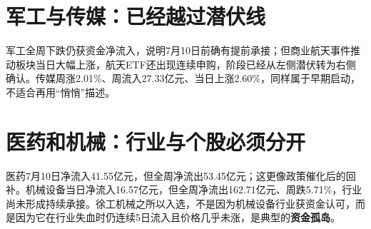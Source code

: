 \section{军工与传媒：已经越过潜伏线}

军工全周下跌仍获资金净流入，说明7月10日前确有提前承接；但商业航天事件推动板块当日大幅上涨，航天ETF还出现连续申购，阶段已经从左侧潜伏转为右侧确认。传媒周涨2.01\%、周流入27.33亿元、当日上涨2.60\%，同样属于早期启动，不适合再用“悄悄”描述。

\section{医药和机械：行业与个股必须分开}

医药7月10日净流入41.55亿元，但全周净流出53.45亿元；这更像政策催化后的回补。机械设备当日净流入16.57亿元，但全周净流出162.71亿元、周跌5.71\%，行业尚未形成持续承接。徐工机械之所以入选，不是因为机械设备行业获资金认可，而是因为它在行业失血时仍连续5日流入且价格几乎未涨，是典型的\textbf{资金孤岛}。
